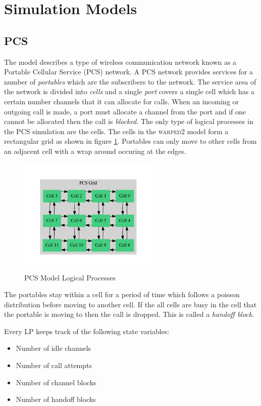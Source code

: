\documentclass[11pt]{book}
\begin{document}
\section{Simulation Models}

\subsection{PCS}

The model describes a type of wireless communication network known as a Portable Cellular
Service (PCS) network. A PCS network provides services for a number of \emph{portables} which
are the subscribers to the network. The service area of the network is divided into
\emph{cells} and a single \emph{port} covers a single cell which has a certain number channels that
it can allocate for calls. When an incoming or outgoing call is made, a port must allocate
a channel from the port and if one cannot be allocated then the call is \emph{blocked}\cite{lin-96b}.
The only type of logical processes in the PCS simulation are the cells. The cells in the
\textsc{warped2} model form a rectangular grid as shown in figure \ref{pcs_model_lps}.
Portables can only move to other cells from an adjacent cell with a wrap around occuring
at the edges.

\begin{figure}[H]
    \centering
    \includegraphics[width=0.6\textwidth,quiet]{figs/graphviz/pcs_model.pdf}
    \caption{PCS Model Logical Processes}\label{pcs_model_lps}
\end{figure}

The portables stay within a cell for a period of time which follows a poisson distribution
before moving to another cell. If the all cells are busy in the cell that the portable
is moving to then the call is dropped. This is called a \emph{handoff block}.

Every LP keeps track of the following state variables:
\begin{itemize}
    \item Number of idle channels
    \item Number of call attempts
    \item Number of channel blocks
    \item Number of handoff blocks
\end{itemize}
\end{document}
